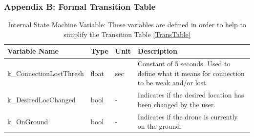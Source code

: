 \documentclass{article}
\begin{document}
\clearpage
\newpage

\subsubsection{Appendix B: Formal Transition Table}
\label{appendixb}

\begin{table}[!h]
\begin{center}
\caption {Internal State Machine Variable: These variables are defined in order to help to simplify the Transition Table \ref{TransTable}} 
\label{tab:InternalVar}
\begin{tabular}{ | m{3cm} | m{2cm} | m{2cm} | m{6cm} | } 
\hline
 Variable Name & Type & Unit & Description \\ 
 \hline
  k_ConnectionLostThresh & float & sec & Constant of 5 seconds. Used to define what it means for connection to be weak and/or lost. \\ 
 \hline
  k_DesiredLocChanged & bool & - & Indicates if the desired location has been changed by the user.  \\ 
 \hline
 k_OnGround & bool & - & Indicates if the drone is currently on the ground.  \\ 
 \hline
\end{tabular}
\end{center}
\end{table}
\end{document}
